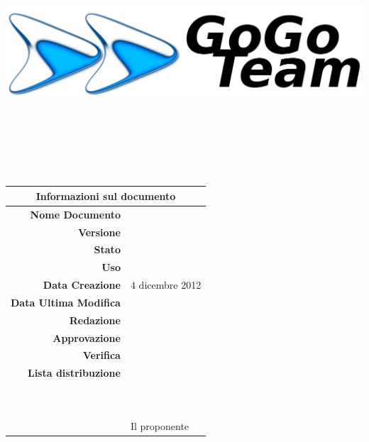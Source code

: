 \thispagestyle{empty}

\begin{titlepage}

\begin{center}
	\dataUM \\
	\vspace{1cm}
	\begin{Huge}
		\textbf{\ggt}
	\end{Huge}
	
	\vspace{2cm}
	
	\includegraphics[scale=0.75]{../imgs/gogoTeamLogo.png}
	
	\vspace{2cm}
	
\HRule \\[0.4cm]
	\begin{Huge}
		{\huge \bfseries \titoloDocumento}\\[0.4cm]
	\end{Huge}
\HRule \\[2.5cm]
	
	\vfill

\begin{table}[h]
\begin{center}
\begin{tabular}{r | l}
\multicolumn{2}{c}{\textbf{Informazioni sul documento}}\\
\midrule
\textbf{Nome Documento}	&	\titoloDocumento	\\
\textbf{Versione}	&	\versione	\\
\textbf{Stato}	&	\emph{\stato}	\\
\textbf{Uso}	&	\emph{\uso}	\\
\textbf{Data Creazione}	&	4 dicembre 2012	\\
\textbf{Data Ultima Modifica}	&	\dataUM	\\
\textbf{Redazione}	&	\DC	\\
\textbf{Approvazione}	&	\MB	\\
\textbf{Verifica}	&	\SL	\\
\textbf{Lista distribuzione}	&	\ggt 	\\
\ 	&	\Vardanega	\\
\ 	&	\Cardin	\\
\ 	&	Il proponente \Zucchetti	\\

\end{tabular}
\end{center}
\end{table}

\end{center}

\end{titlepage}